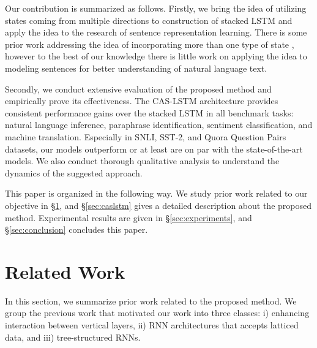 \documentclass[wcp]{jmlr}
\begin{document}
    Our contribution is summarized as follows.
    Firstly, we bring the idea of utilizing states coming from multiple directions to construction of stacked LSTM and apply the idea to the research of sentence representation learning.
    There is some prior work addressing the idea of incorporating more than one type of state \citep{graves2007mdrnn,kalchbrenner2016grid,zhang2016highway}, however to the best of our knowledge there is little work on applying the idea to modeling sentences for better understanding of natural language text.
    
    Secondly, we conduct extensive evaluation of the proposed method and empirically prove its effectiveness.
    The CAS-LSTM architecture provides consistent performance gains over the stacked LSTM in all benchmark tasks: natural language inference, paraphrase identification, sentiment classification, and machine translation.
    Especially in SNLI, SST-2, and Quora Question Pairs datasets, our models outperform or at least are on par with the state-of-the-art models.
    We also conduct thorough qualitative analysis to understand the dynamics of the suggested approach.
    
    This paper is organized in the following way.
    We study prior work related to our objective in \S\ref{sec:related}, and
    \S\ref{sec:caslstm} gives a detailed description about the proposed method.
    Experimental results are given in \S\ref{sec:experiments}, and 
    \S\ref{sec:conclusion} concludes this paper.
    
    \section{Related Work}
    \label{sec:related}
    In this section, we summarize prior work related to the proposed method.
    We group the previous work that motivated our work into three classes: i) enhancing interaction between vertical layers, ii) RNN architectures that accepts latticed data, and iii) tree-structured RNNs.
    
\end{document}
